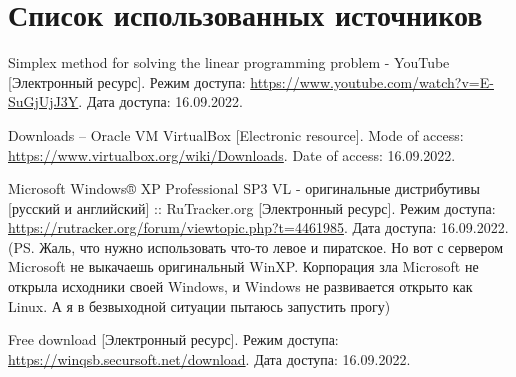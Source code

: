 \newpage

\begingroup
  \section*{Список использованных источников}

  \renewcommand{\addcontentsline}[3]{}%
  \renewcommand{\section}[2]{}%

  \begin{thebibliography}{}
    Simplex method for solving the linear programming problem - YouTube
    [Электронный ресурс].
    Режим доступа: \url{https://www.youtube.com/watch?v=E-SuGjUjJ3Y}.
    Дата доступа: 16.09.2022.

    Downloads – Oracle VM VirtualBox
    [Electronic resource].
    Mode of access: \url{https://www.virtualbox.org/wiki/Downloads}.
    Date of access: 16.09.2022.

    Microsoft Windows® XP Professional SP3 VL - оригинальные дистрибутивы [русский и английский] :: RuTracker.org
    [Электронный ресурс].
    Режим доступа: \url{https://rutracker.org/forum/viewtopic.php?t=4461985}.
    Дата доступа: 16.09.2022.
    (PS. Жаль, что нужно использовать что-то левое и пиратское.
    Но вот с сервером Microsoft не выкачаешь оригинальный WinXP.
    Корпорация зла Microsoft не открыла исходники своей Windows,
    и Windows не развивается открыто как Linux.
    А я в безвыходной ситуации пытаюсь запустить прогу)

    Free download
    [Электронный ресурс].
    Режим доступа: \url{https://winqsb.secursoft.net/download}.
    Дата доступа: 16.09.2022. 
  \end{thebibliography}
\endgroup

\begingroup
  \section*{Литература, чтобы писать в LaTeX}
  \addcontentsline{toc}{section}{Литература, чтобы писать в LaTeX}

